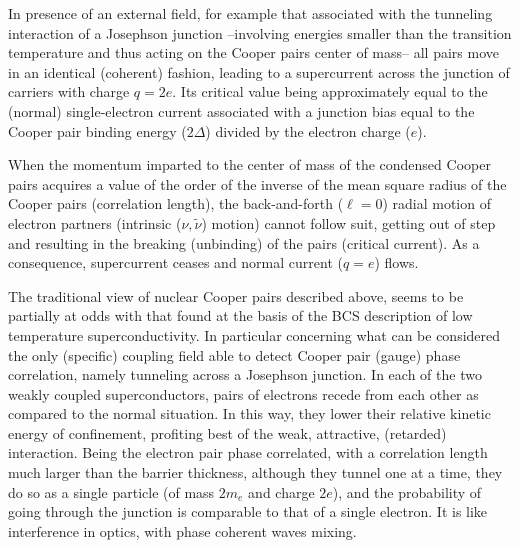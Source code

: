 In presence of an external field, for example that associated with the tunneling interaction of a Josephson junction --involving energies smaller than the transition temperature and thus acting on the Cooper pairs center of mass-- all pairs move  in an identical (coherent) fashion, leading to a supercurrent across the junction of carriers with charge $q=2e$. Its critical value  being approximately equal to the (normal) single-electron current associated with a junction bias equal to the Cooper pair binding energy ($2\Delta$) divided by the electron charge ($e$).

When the momentum imparted to the center of mass of the condensed Cooper pairs acquires a value of the order of the inverse of the mean square radius of the Cooper pairs (correlation length), the back-and-forth ($\ell=0$) radial motion of electron partners (intrinsic ($\nu,\tilde \nu$) motion) cannot follow suit, getting out of step and resulting in the breaking (unbinding) of the pairs (critical current). As a consequence, supercurrent ceases and  normal current ($q=e$) flows.

The traditional view of nuclear Cooper pairs described above, seems to be partially at odds with that found at the basis of the BCS description of low temperature superconductivity. In particular concerning what can be considered the only (specific) coupling field able to detect Cooper pair (gauge) phase correlation, namely tunneling across a Josephson junction. In each of the two weakly coupled superconductors, pairs of electrons recede from each other  as compared to the normal situation. In this way, they lower their relative kinetic energy of confinement, profiting best of the weak, attractive, (retarded) interaction. Being the electron pair phase correlated, with a correlation length much larger than the barrier thickness, although they tunnel one at a time, they do so as a single particle (of mass $2m_e$ and charge $2e$), and the probability of going through the junction is comparable to that of a single electron. It is like interference in optics, with phase coherent waves mixing.

